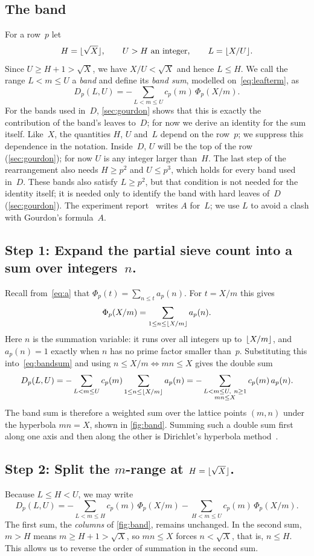 \documentclass[11pt,a4paper]{amsart}
\numberwithin{equation}{section}
\DeclarePairedDelimiter{\floor}{\lfloor}{\rfloor}
\newcommand{\step}[1]{\subsection*{#1}}
\begin{document}
\subsection{The band}
For a row~$p$ let
\begin{equation}\label{eq:band}
  H=\floor{\sqrt X},\qquad U>H \text{ an integer},\qquad L=\floor{X/U}.
\end{equation}
Since $U\ge H+1>\sqrt X$, we have $X/U<\sqrt X$ and hence $L\le H$. We call
the range $L<m\le U$ a \emph{band} and define its \emph{band sum}, modelled
on~\eqref{eq:leafterm}, as
\begin{equation}\label{eq:bandsum}
  D_p(L,U)=-\sum_{L<m\le U}c_p(m)\,\Phi_p(X/m).
\end{equation}
For the bands used in~$D$, \cref{sec:gourdon} shows that this is exactly the
contribution of the band's leaves to~$D$; for now we derive an identity for the
sum itself. Like~$X$, the quantities $H$, $U$ and~$L$ depend on the row~$p$; we suppress
this dependence in the notation. Inside~$D$, $U$ will be the top of the row
(\cref{sec:gourdon}); for now $U$ is any integer larger than~$H$. The last step
of the rearrangement also needs $H\ge p^2$ and $U\le p^3$, which holds for
every band used in~$D$. These bands also satisfy $L\ge p^2$, but that condition is
not needed for the identity itself; it is needed only to identify the band with
hard leaves of~$D$ (\cref{sec:gourdon}). The experiment report~\cite{Lin2026}
writes $A$ for~$L$; we use $L$ to avoid a clash with Gourdon's formula~$A$.

\step{Step 1: Expand the partial sieve count into a sum over integers~\texorpdfstring{$n$}{n}.}
Recall from~\eqref{eq:a} that $\Phi_p(t)=\sum_{n\le t}a_p(n)$. For $t=X/m$
this gives
\[
  \Phi_p(X/m)=\sum_{1\le n\le\floor{X/m}}a_p(n).
\]
Here $n$ is the summation variable: it runs over all integers up
to~$\floor{X/m}$, and $a_p(n)=1$ exactly when $n$ has no prime factor smaller
than~$p$. Substituting this into~\eqref{eq:bandsum} and using
$n\le X/m\iff mn\le X$ gives the double sum
\[
  D_p(L,U)=-\sum_{L<m\le U}c_p(m)\sum_{1\le n\le\floor{X/m}}a_p(n)
  =-\sum_{\substack{L<m\le U,\ n\ge1\\ mn\le X}}c_p(m)\,a_p(n).
\]
The band sum is therefore a weighted sum over the lattice points $(m,n)$ under
the hyperbola $mn=X$, shown in \cref{fig:band}. Summing such a double sum
first along one axis and then along the other is Dirichlet's hyperbola
method~\cite[Ch.~3]{Apostol1976}.

\step{Step 2: Split the \texorpdfstring{$m$}{m}-range at \texorpdfstring{$H=\floor{\sqrt X}$}{H}.}
Because $L\le H<U$, we may write
\[
  D_p(L,U)=-\sum_{L<m\le H}c_p(m)\,\Phi_p(X/m)
  -\sum_{H<m\le U}c_p(m)\,\Phi_p(X/m).
\]
The first sum, the \emph{columns} of \cref{fig:band}, remains unchanged. In
the second sum, $m>H$ means $m\ge H+1>\sqrt X$, so $mn\le X$ forces
$n<\sqrt X$, that is, $n\le H$. This allows us to reverse the order of
summation in the second sum.
\end{document}
